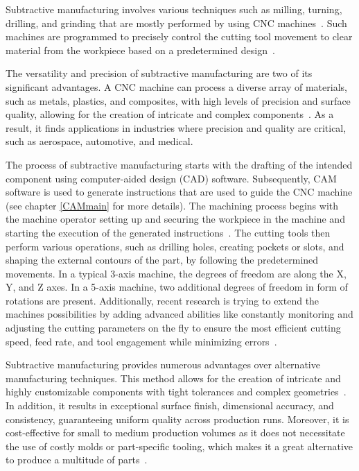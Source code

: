 Subtractive manufacturing involves various techniques such as milling, turning, drilling, and grinding that are mostly performed by using CNC machines~\cite{Kumar.2020}. Such machines are programmed to precisely control the cutting tool movement to clear material from the workpiece based on a predetermined design~\cite{Amanullah.2017}.

The versatility and precision of subtractive manufacturing are two of its significant advantages. A CNC machine can process a diverse array of materials, such as metals, plastics, and composites, with high levels of precision and surface quality, allowing for the creation of intricate and complex components~\cite{Tomaz.2021,Yang.2019}. As a result, it finds applications in industries where precision and quality are critical, such as aerospace, automotive, and medical.

The process of subtractive manufacturing starts with the drafting of the intended component using computer-aided design (CAD) software. Subsequently, CAM software is used to generate instructions that are used to guide the CNC machine (see chapter \ref{CAMmain} for more details). The machining process begins with the machine operator setting up and securing the workpiece in the machine and starting the execution of the generated instructions~\cite{Nee.2015}. The cutting tools then perform various operations, such as drilling holes, creating pockets or slots, and shaping the external contours of the part, by following the predetermined movements. In a typical 3-axis machine, the degrees of freedom are along the X, Y, and Z axes. In a 5-axis machine, two additional degrees of freedom in form of rotations are present.   Additionally, recent research is trying to extend the machines possibilities by adding advanced abilities like constantly monitoring and adjusting the cutting parameters on the fly to ensure the most efficient cutting speed, feed rate, and tool engagement while minimizing errors~\cite{Tien.2021}.


Subtractive manufacturing provides numerous advantages over alternative manufacturing techniques. This method allows for the creation of intricate and highly customizable components with tight tolerances and complex geometries~\cite{Jayawardane.2023}. In addition, it results in exceptional surface finish, dimensional accuracy, and consistency, guaranteeing uniform quality across production runs. Moreover, it is cost-effective for small to medium production volumes as it does not necessitate the use of costly molds or part-specific tooling, which makes it a great alternative to produce a multitude of parts~\cite{Gu.2018}.

